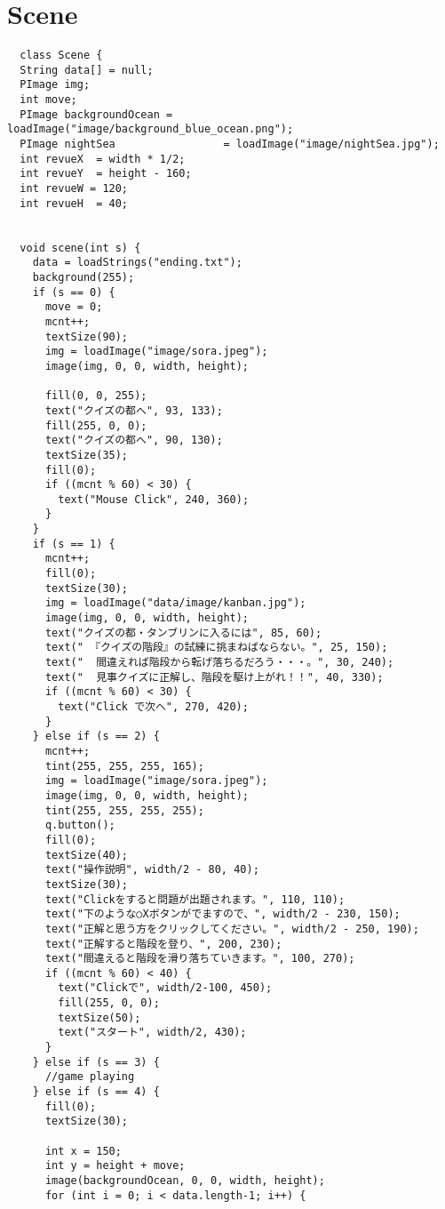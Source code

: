 \documentclass{jsarticle}
\begin{document}
\section{Scene}
\begin{tiny}
  \begin{lstlisting}
  class Scene {
  String data[] = null;
  PImage img;
  int move;
  PImage backgroundOcean = loadImage("image/background_blue_ocean.png");
  PImage nightSea                 = loadImage("image/nightSea.jpg");
  int revueX  = width * 1/2;
  int revueY  = height - 160;
  int revueW = 120;
  int revueH  = 40;
  

  void scene(int s) {
    data = loadStrings("ending.txt"); 
    background(255);
    if (s == 0) {
      move = 0;
      mcnt++;
      textSize(90);
      img = loadImage("image/sora.jpeg");
      image(img, 0, 0, width, height);

      fill(0, 0, 255);
      text("クイズの都へ", 93, 133);
      fill(255, 0, 0);
      text("クイズの都へ", 90, 130);
      textSize(35);
      fill(0);
      if ((mcnt % 60) < 30) {
        text("Mouse Click", 240, 360);
      }
    }
    if (s == 1) {
      mcnt++;
      fill(0);
      textSize(30);
      img = loadImage("data/image/kanban.jpg");
      image(img, 0, 0, width, height);
      text("クイズの都・タンブリンに入るには", 85, 60);
      text(" 『クイズの階段』の試練に挑まねばならない。", 25, 150);
      text("  間違えれば階段から転げ落ちるだろう・・・。", 30, 240);
      text("  見事クイズに正解し、階段を駆け上がれ！！", 40, 330);
      if ((mcnt % 60) < 30) {
        text("Click で次へ", 270, 420);
      }
    } else if (s == 2) {
      mcnt++;
      tint(255, 255, 255, 165);
      img = loadImage("image/sora.jpeg");
      image(img, 0, 0, width, height);
      tint(255, 255, 255, 255);
      q.button();
      fill(0);
      textSize(40);
      text("操作説明", width/2 - 80, 40);
      textSize(30);
      text("Clickをすると問題が出題されます。", 110, 110);
      text("下のような○Xボタンがでますので、", width/2 - 230, 150);
      text("正解と思う方をクリックしてください。", width/2 - 250, 190);
      text("正解すると階段を登り、", 200, 230);
      text("間違えると階段を滑り落ちていきます。", 100, 270);
      if ((mcnt % 60) < 40) {
        text("Clickで", width/2-100, 450);
        fill(255, 0, 0);
        textSize(50);
        text("スタート", width/2, 430);
      }
    } else if (s == 3) {
      //game playing
    } else if (s == 4) {
      fill(0);
      textSize(30);

      int x = 150;
      int y = height + move;
      image(backgroundOcean, 0, 0, width, height);
      for (int i = 0; i < data.length-1; i++) {


\end{lstlisting}
\end{tiny}
\end{document}
